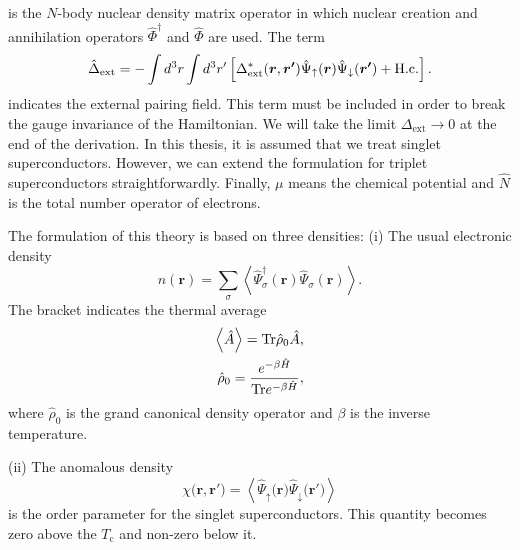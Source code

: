 %
is the $N$-body nuclear density matrix operator in which nuclear creation and annihilation operators 
$\hat{\Phi}^\dag$ and $\hat{\Phi}$ are used. The term
%
\begin{equation} %
	\hat{\Delta}_\mathrm{ext} = - \int d^3r \int d^3r' \left[\Delta^{\ast}_\mathrm{ext}(\bm{r}, \bm{r'})
	                                                                            \hat{\Psi}_\uparrow(\bm{r})\hat{\Psi}_\downarrow(\bm{r'})
	                                                                            + \rm{H.c.} \right].
\end{equation} 
%
indicates the external pairing field. This term must be included in order to break the gauge invariance of
the Hamiltonian. We will take the limit $\Delta_\mathrm{ext} \to 0$ at the end of the derivation.
In this thesis, it is assumed that we treat singlet superconductors. However,  we can extend the formulation 
for triplet superconductors straightforwardly.
Finally, $\mu$ means the chemical potential and $\hat{N}$ is the total number operator of electrons. 

The formulation of this theory is based on three densities: (i) The usual electronic density 
%
\begin{equation} %
	n\left(\bm{r}\right) = \sum_{\sigma}\left<\hat{\Psi}^\dag_\sigma \left(\bm{r}\right)
	                                                               \hat{\Psi}_\sigma \left(\bm{r}\right) \right>.
\end{equation}
%
The bracket indicates the thermal average
%
\begin{equation}
\begin{split}
	\left< \hat{A} \right> = {\rm Tr}\hat{\rho}_0\hat{A}, \\
	\hat{\rho}_0 = \frac{e^{-\beta\hat{H}}}{{\rm Tr}e^{-\beta\hat{H}}},
\end{split}
\end{equation}
%
where $\hat{\rho}_0$ is the grand canonical density operator and $\beta$ is the inverse temperature.

(ii) The anomalous density
%
\begin{equation} %
	\chi \bigl(\bm{r}, \bm{r'} \bigr) = \left<\hat{\Psi}_\uparrow \bigl(\bm{r}\bigr)
	                                                    \hat{\Psi}_\downarrow \bigl(\bm{r'}\bigr) \right>
\end{equation}
%
is the order parameter for the singlet superconductors. This quantity becomes zero above the $T_\mathrm{c}$ and non-zero below it.

